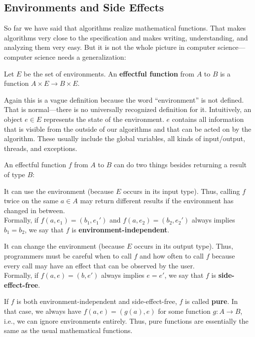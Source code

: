 \subsection{Environments and Side Effects}

So far we have said that algorithms realize mathematical functions.
That makes algorithms very close to the specification and makes writing, understanding, and analyzing them very easy.
But it is not the whole picture in computer science---computer science needs a generalization:

\begin{definition}
Let $E$ be the set of environments.
An \textbf{effectful function} from $A$ to $B$ is a function $A\times E\to B\times E$.
\end{definition}

Again this is a vague definition because the word ``environment'' is not defined.
That is normal---there is no universally recognized definition for it.
Intuitively, an object $e\in E$ represents the state of the environment.
$e$ contains all information that is visible from the outside of our algorithms and that can be acted on by the algorithm.
These usually include the global variables, all kinds of input/output, threads, and exceptions.

An effectful function $f$ from $A$ to $B$ can do two things besides returning a result of type $B$:
\begin{compactitem}
 \item It can use the environment (because $E$ occurs in its input type).
   Thus, calling $f$ twice on the same $a\in A$ may return different results if the environment has changed in between.\\
   Formally, if $f(a,e_1)=(b_1,e_1')$ and $f(a,e_2)=(b_2,e_2')$ always implies $b_1=b_2$, we say that $f$ is \textbf{environment-independent}.
 \item It can change the environment (because $E$ occurs in its output type).
   Thus, programmers must be careful when to call $f$ and how often to call $f$ because every call may have an effect that can be observed by the user.\\
   Formally, if $f(a,e)=(b,e')$ always implies $e=e'$, we say that $f$ is \textbf{side-effect-free}.
\end{compactitem}
If $f$ is both environment-independent and side-effect-free, $f$ is called \textbf{pure}.
In that case, we always have $f(a,e)=(g(a),e)$ for some function $g:A\to B$, i.e., we can ignore environments entirely.
Thus, pure functions are essentially the same as the usual mathematical functions.

